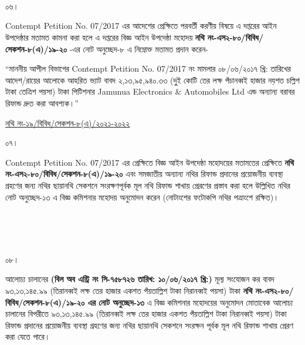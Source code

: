 \documentclass[12pt]{article}
\newcommand{\fileno}{নথি নং-১৯/বিবিধ/সেকশন-৮(এ)/২০২১-২০২২}
\newcommand{\tvat}{২,১৩,৯৫,৯৪০.৩৩ (দু্ই কোটি তের লক্ষ পঁচানব্বই হাজার নয়শত চল্লিশ টাকা তেত্রিশ পয়সা) টাকা}
\newcommand{\vat}{৯৩,১৩,১৪৫.৯৯ (তিরানব্বই লক্ষ তের হাজার একশত পঁয়তাল্লিশ টাকা নিরানব্বই পয়সা) টাকা}
\newcommand{\cno}{৭৫৮৭২৬}
\newcommand{\dt}{১০/০৬/২০১৭}
\begin{document}
\\
\\
\\
\begin{minipage}[t]{0.05\linewidth}
০৬।
\end{minipage}
\begin{minipage}[t]{1\linewidth}
Contempt Petition No. 07/2017
এর আদেশের প্রেক্ষিতে পরবর্তী
করণীয় বিষয়ে এ দপ্তরের আইন
উপদেষ্ঠার মতামত কামনা করা হলে এ দপ্তরের
বিজ্ঞ আইন উপদেষ্ঠা মহোদয়
\textbf{নথি নং-এস২-৮০/বিবিধ/সেকশন-৮(এ)/১৯-২০}
-এর নোট অনুচ্ছেদ-৮ এ নিম্নোক্ত মতামত প্রদান করেন-


\hspace{1em}``মাননীয় আপীল বিভাগের
Contempt Petition No. 07/2017
নং মামলার ০৮/০৬/২০১৭ খ্রি: তারিখের
আদেশ/রায়ের আলোকে আহরিত ভ্যাট বাবদ
{\tvat} পিটিশনার
Jamunua Electronics \& Automobiles Ltd
এন্ড অন্যান্য বরাবর রিফান্ড
দ্রুত করা আবশ্যক।''
\end{minipage}
\newpage
\begin{minipage}[t]{0.59\linewidth}
\hspace{0.5em}
\end{minipage}
\begin{minipage}[t]{1\textwidth}
\underline{{\fileno}}
\end{minipage}
\begin{minipage}[t]{0.05\linewidth}
০৭।
\end{minipage}
\begin{minipage}[t]{1\linewidth}
Contempt Petition No. 07/2017
এর প্রেক্ষিতে বিজ্ঞ আইন উপদেষ্ঠা মহোদয়ের
মতামতের প্রেক্ষিতে
\textbf{নথি নং-এস২-৮০/বিবিধ/সেকশন-৮(এ)/১৯-২০}
এবং সমজাতীয় অন্যান্য নথির
রিফান্ড প্রদানের প্রয়োজনীয় ব্যবস্থা গ্রহণের
জন্য নথির ছায়ানথি সেকশনে
সংরক্ষণপূর্বক মূল নথি রিফান্ড
শাখায় প্রেরণের প্রস্তাব করা হলে উল্লিখিত নথির
নোট অনুচ্ছেদ-১৩ এ বিজ্ঞ কমিশনার মহোদয় অনুমোদন
করেন (নোটাংশের ফটোকপি নথির পত্রাংশে রক্ষিত)।
\end{minipage}
\\
\\
\\
\begin{minipage}[t]{0.05\linewidth}
০৮।
\end{minipage}
\begin{minipage}[t]{1\linewidth}
আলোচ্য চালানের
\textbf{(বিল অব এন্ট্রি নং সি-{\cno} তারিখ: {\dt} খ্রি:)} মূল্য সংযোজন কর বাবদ
{\vat} \textbf{নথি নং-এস২-৮০/বিবিধ/সেকশন-৮(এ)/১৯-২০
এর নোট অনুচ্ছেদ-১৩} এ বিজ্ঞ কমিশনার মহোদয়ের
অনুমোদন মোতাবেক আলোচ্য চালানের
বিপরীতে
{\vat} রিফান্ড প্রদানের প্রয়োজনীয় ব্যবস্থা গ্রহণের জন্য
নথির ছায়ানথি সেকশনে সংরক্ষন পূর্বক
মূল নথি রিফান্ড শাখায় প্রেরণ করা যেতে পারে।
\end{minipage}



\thispagestyle{laststyle}
\end{document}
